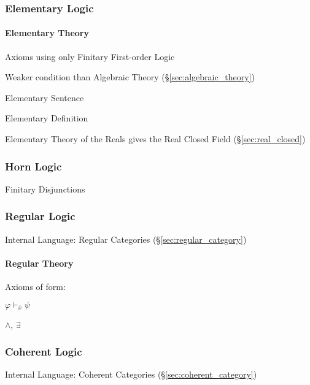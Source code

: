 \subsubsection{Elementary Logic}\label{sec:elementary_logic}

\paragraph{Elementary Theory}\label{sec:elementary_theory}\hfill

Axioms using only Finitary First-order Logic %

Weaker condition than Algebraic Theory (\S\ref{sec:algebraic_theory})

Elementary Sentence

Elementary Definition

Elementary Theory of the Reals gives the Real Closed Field
(\S\ref{sec:real_closed})



\subsubsection{Horn Logic}\label{sec:horn_logic}

Finitary Disjunctions



\subsubsection{Regular Logic}\label{sec:regular_logic}

Internal Language: Regular Categories (\S\ref{sec:regular_category})



\paragraph{Regular Theory}\label{sec:regular_theory}\hfill

Axioms of form:

$\varphi \vdash_{\overline{x}} \psi$

$\wedge$, $\exists$



\subsubsection{Coherent Logic}\label{sec:coherent_logic}

Internal Language: Coherent Categories (\S\ref{sec:coherent_category})



